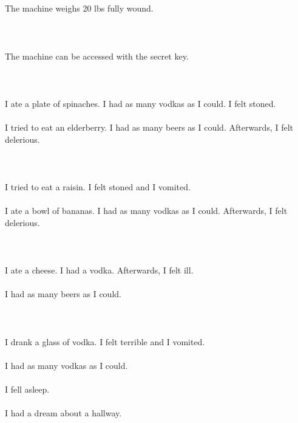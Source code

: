 \documentclass{article}
\begin{document}
    \section{}
    The machine weighs 20 lbs fully wound.\\\\ 
    \newpage
    
    \section{}
    The machine can be accessed with the secret key.\\\\ 
    \newpage
    
    \section{}
    I ate a plate of spinaches. I had as many vodkas as I could. I felt stoned.\\\\I tried to eat an elderberry. I had as many beers as I could. Afterwards, I felt delerious.\\\\ 
    \newpage
    
    \section{}
    I tried to eat a raisin. I felt stoned and I vomited.\\\\I ate a bowl of bananas. I had as many vodkas as I could. Afterwards, I felt delerious.\\\\ 
    \newpage
    
    \section{}
    I ate a cheese. I had a vodka. Afterwards, I felt ill.\\\\I had as many beers as I could.\\\\ 
    \newpage
    
    \section{}
    I drank a glass of vodka. I felt terrible and I vomited.\\\\I had as many vodkas as I could.\\\\I fell asleep.\\\\I had a dream about a hallway.\\\\ 
    \newpage
    
\end{document}

